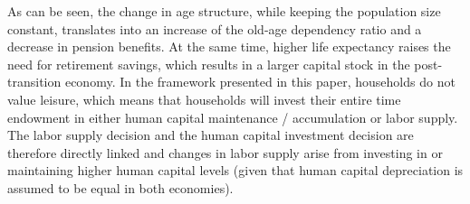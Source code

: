 As can be seen, the change in age structure, while keeping the population size constant, translates into an increase of the old-age dependency ratio and a decrease in pension benefits. At the same time, higher life expectancy raises the need for retirement savings, which results in a larger capital stock in the post-transition economy. In the framework presented in this paper, households do not value leisure, which means that households will invest their entire time endowment in either human capital maintenance / accumulation or labor supply. The labor supply decision and the human capital investment decision are therefore directly linked and changes in labor supply arise from investing in or maintaining higher human capital levels (given that human capital depreciation is assumed to be equal in both economies).